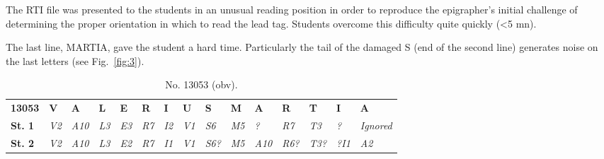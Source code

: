 \documentclass[amsthm,ebook]{saparticle}
\begin{document}
The RTI file was presented to the students in an unusual reading position in order to reproduce the epigrapher’s initial
challenge of determining the proper orientation in which to read the lead tag. Students overcome this difficulty quite
quickly ({\textless}5 mn).

The last line, MARTIA, gave the student a hard time. Particularly the tail of the damaged S (end of the second line)
generates noise on the last letters (see Fig.~\ref{fig:3}).

\begin{table}
{\small
\addtolength{\tabcolsep}{-0.8mm}

\begin{tabular*}{\textwidth}{lllllllllllllll}
 & & & & & & & & & & & & & \\
\toprule
\textbf{13053} & \textbf{V} & \textbf{A} & \textbf{L} & \textbf{E} & \textbf{R} & \textbf{I} & \textbf{U} & \textbf{S} & \textbf{M} & \textbf{A} & \textbf{R} & \textbf{T} & \textbf{I} & \textbf{A}\\ \midrule
\textbf{St. 1}& \textit{V2} & \textit{A10} & \textit{L3} & \textit{E3} & \textit{R7} & \textit{I2} & \textit{V1} & \textit{S6} & \textit{M5} & \textit{?} & \textit{R7} & \textit{T3} & \textit{?} & \textit{Ignored} \\
\textbf{St. 2}& \textit{V2} & \textit{A10} & \textit{L3} & \textit{E2} & \textit{R7} & \textit{I1} & \textit{V1} & \textit{S6?} & \textit{M5} & \textit{A10} & \textit{R6?} & \textit{T3?} & \textit{?I1} & \textit{A2} \\
\bottomrule
\end{tabular*}}

\caption{No. 13053 (obv).}
\label{tab:table2}
\end{table}
\end{document}
